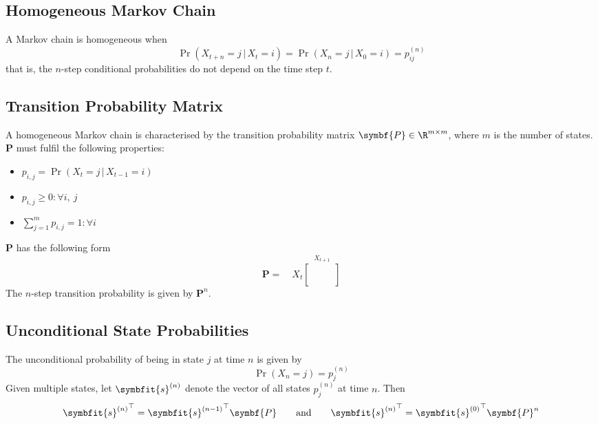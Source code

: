 \documentclass{article}
\begin{document}
\subsection{Homogeneous Markov Chain}
A Markov chain is homogeneous when
\begin{equation*}
    \Pr{\left( X_{t+n} = j \,\vert\, X_t = i \right)} = \Pr{\left( X_n = j \,\vert\, X_0 = i \right)} = p_{ij}^{(n)}
\end{equation*}
that is, the \(n\)-step conditional probabilities do not depend on the time step \(t\).
\subsection{Transition Probability Matrix}
A homogeneous Markov chain is characterised by the transition probability matrix \(\symbf{P} \in \R^{m \times m}\), where
\(m\) is the number of states.
\(\symbf{P}\) must fulfil the following properties:
\begin{itemize}
    \item \(p_{i,j} = \Pr{\left( X_t = j \,\vert\, X_{t-1} = i \right)}\)
    \item \(p_{i,j} \geq 0 : \forall i,\: j\)
    \item \(\sum_{j=1}^m p_{i,j} = 1 : \forall i\)
\end{itemize}
\(\symbf{P}\) has the following form
\begin{equation*}
    \symbf{P} = \quad \scriptscriptstyle{X_t} \overset{X_{t+1}}{\begin{bmatrix}
            \phantom{p} & \phantom{p} \\
            \phantom{p} & \phantom{p}
        \end{bmatrix}}
\end{equation*}
The \(n\)-step transition probability is given by \(\symbf{P}^n\).
\subsection{Unconditional State Probabilities}
The unconditional probability of being in state \(j\) at time \(n\) is given by
\begin{equation*}
    \Pr{\left( X_n = j \right)} = p_j^{(n)}
\end{equation*}
Given multiple states, let \(\symbfit{s}^{(n)}\) denote the vector of all states \(p_j^{(n)}\) at
time \(n\). Then
\begin{align*}
    {\symbfit{s}^{(n)}}^\top = {\symbfit{s}^{(n-1)}}^\top \symbf{P} \quad \quad \text{and} \quad \quad {\symbfit{s}^{(n)}}^\top = {\symbfit{s}^{(0)}}^\top \symbf{P}^n
\end{align*}
\end{document}
